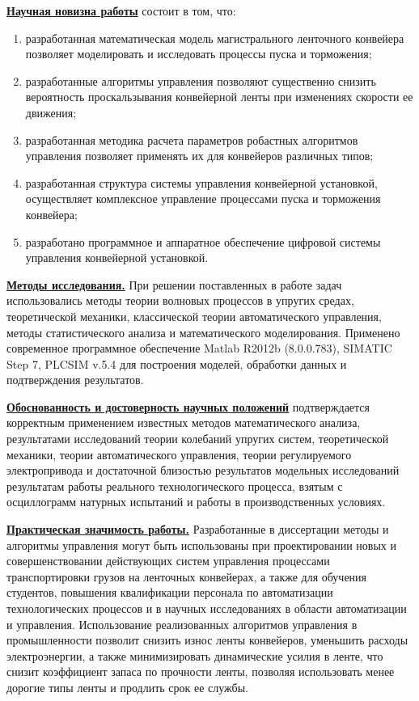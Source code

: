 \underline{\textbf{Научная новизна работы}} состоит в том, что:
\begin{enumerate}
	\item разработанная математическая модель магистрального ленточного конвейера позволяет моделировать и исследовать процессы пуска и торможения;
	\item разработанные алгоритмы управления позволяют существенно снизить вероятность проскальзывания конвейерной ленты при изменениях скорости ее движения;
	\item разработанная методика расчета параметров робастных алгоритмов управления позволяет применять их для конвейеров различных типов;
	\item разработанная структура системы управления конвейерной установкой, осуществляет комплексное управление процессами пуска и торможения конвейера;
	\item разработано программное и аппаратное обеспечение цифровой системы управления конвейерной установкой.
\end{enumerate}
\bigskip

\underline{\textbf{Методы исследования.}} При решении поставленных в работе задач использовались методы теории волновых процессов в упругих средах, теоретической механики, классической теории автоматического управления, методы статистического анализа и математического моделирования. Применено современное программное обеспечение Matlab R2012b (8.0.0.783), SIMATIC Step 7, PLCSIM v.5.4 для построения моделей, обработки данных и подтверждения результатов.
\bigskip

\underline{\textbf{Обоснованность и достоверность научных положений}} подтверждается корректным применением известных методов математического анализа, результатами исследований теории колебаний упругих систем, теоретической механики, теории автоматического управления, теории регулируемого электропривода и достаточной близостью результатов модельных исследований результатам работы реального технологического процесса, взятым с осциллограмм натурных испытаний и работы в производственных условиях.
\bigskip

\underline{\textbf{Практическая значимость работы.}} Разработанные в диссертации методы и алгоритмы управления могут быть использованы при проектировании новых и совершенствовании действующих систем управления процессами транспортировки грузов на ленточных конвейерах, а также для обучения студентов, повышения квалификации персонала по автоматизации технологических процессов и в научных исследованиях в области автоматизации и управления. Использование реализованных алгоритмов управления в промышленности позволит снизить износ ленты конвейеров, уменьшить расходы электроэнергии, а также минимизировать динамические усилия в ленте, что снизит коэффициент запаса по прочности ленты, позволяя использовать менее дорогие типы ленты и продлить срок ее службы.
\bigskip

